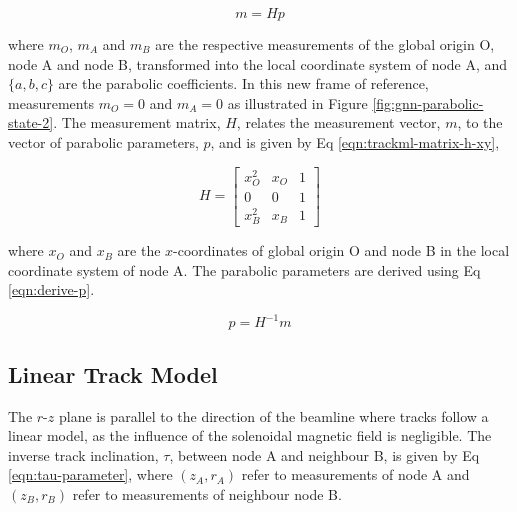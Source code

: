 \begin{equation}
    m = H p 
    \label{eqn:parabolic-equations}
\end{equation}

where $m_O$, $m_A$ and $m_B$ are the respective measurements of the global origin O, node A and node B, transformed into the local coordinate system of node A, and $\{a, b, c\}$ are the parabolic coefficients. In this new frame of reference, measurements $m_O = 0$ and $m_A = 0$ as illustrated in Figure \ref{fig:gnn-parabolic-state-2}. The measurement matrix, $H$, relates the measurement vector, $m$, to the vector of parabolic parameters, $p$, and is given by Eq \eqref{eqn:trackml-matrix-h-xy},

\begin{equation}
    H = \begin{bmatrix} x_O^{2} & x_O & 1 \\ 0 & 0 & 1 \\ x_B^{2} & x_B & 1 \end{bmatrix} 
    \label{eqn:trackml-matrix-h-xy}
\end{equation}

where $x_O$ and $x_B$ are the $x$-coordinates of global origin O and node B in the local coordinate system of node A. The parabolic parameters are derived using Eq \eqref{eqn:derive-p}.

\begin{equation}
    p = H^{-1} m 
    \label{eqn:derive-p}
\end{equation}




\subsection{Linear Track Model}
\label{linear-state}

The $r$-$z$ plane is parallel to the direction of the beamline where tracks follow a linear model, as the influence of the solenoidal magnetic field is negligible. The inverse track inclination, $\tau$, between node A and neighbour B, is given by Eq \eqref{eqn:tau-parameter}, where $(z_A, r_A)$ refer to measurements of node A and $(z_B, r_B)$ refer to measurements of neighbour node B.

